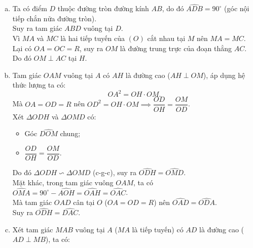 \begin{bt}
{\begin{center}
\end{center}
\begin{enumerate}[a)]
	\item Ta có điểm $D$ thuộc đường tròn đường kính $AB$, do đó $\widehat{ADB} = 90^\circ$ (góc nội tiếp chắn nửa đường tròn).\\
	Suy ra tam giác $ABD$ vuông tại $D$.\\
	Vì $MA$ và $MC$ là hai tiếp tuyến của $(O)$ cắt nhau tại $M$ nên $MA = MC$.\\
	Lại có $OA = OC = R$, suy ra $OM$ là đường trung trực của đoạn thẳng $AC$.\\
	Do đó $OM \perp AC$ tại $H$.
	\item Tam giác $OAM$ vuông tại $A$ có $AH$ là đường cao ($AH \perp OM$), áp dụng hệ thức lượng ta có:
	$$OA^2 = OH \cdot OM.$$
	Mà $OA = OD = R$ nên $OD^2 = OH \cdot OM \implies \dfrac{OD}{OH} = \dfrac{OM}{OD}$.\\
	Xét $\Delta ODH$ và $\Delta OMD$ có:
	\begin{itemize}
		\item Góc $\widehat{DOM}$ chung;
		\item $\dfrac{OD}{OH} = \dfrac{OM}{OD}$.
	\end{itemize}
	Do đó $\Delta ODH \backsim \Delta OMD$ (c-g-c), suy ra $\widehat{ODH} = \widehat{OMD}$.\\
	Mặt khác, trong tam giác vuông $OAM$, ta có $\widehat{OMA} = 90^\circ - \widehat{AOH} = \widehat{OAH} = \widehat{OAC}$.\\
	Mà tam giác $OAD$ cân tại $O$ ($OA = OD = R$) nên $\widehat{OAD} = \widehat{ODA}$.\\
	Suy ra $\widehat{ODH} = \widehat{DAC}$.
	\item Xét tam giác $MAB$ vuông tại $A$ ($MA$ là tiếp tuyến) có $AD$ là đường cao ($AD \perp MB$), ta có:

\end{enumerate}}
\end{bt}
